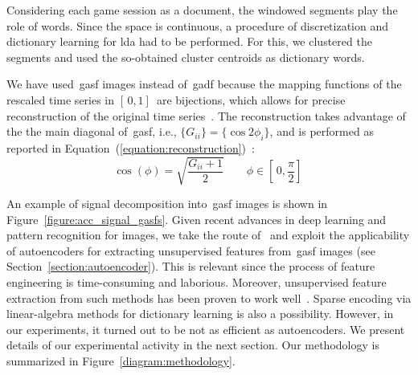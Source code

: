 Considering each game session as a document, the windowed segments play the role of words. Since the space is continuous, a procedure of discretization and dictionary learning for \gls{lda} had to be performed. For this, we clustered the segments and used the so-obtained cluster centroids as dictionary words.

We have used~\gls{gasf} images instead of~\gls{gadf} because the mapping functions of the rescaled time series in $[\,0,1]\,$ are bijections, which allows for precise reconstruction of the original time series~\cite{wang_imaging_2015}. The reconstruction takes advantage of the the main diagonal of~\gls{gasf}, i.e., $\{G_{ii}\} = \{\cos{2\phi_{i}}\}$, and is performed as reported in Equation~(\ref{equation:reconstruction})~\cite{wang_imaging_2015}: 
\begin{equation}\label{equation:reconstruction}
\cos(\phi)=\sqrt{\frac{G_{ii}+1}{2}} \qquad \phi \in [\,0,\frac{\pi}{2}]\,
\end{equation}

An example of signal decomposition into~\gls{gasf} images is shown in Figure~\ref{figure:acc_signal_gasfs}. Given recent advances in deep learning and pattern recognition for images, we take the route of~\cite{wang_encoding_2015} and exploit the applicability of autoencoders for extracting unsupervised features from~\gls{gasf} images (see Section~\ref{section:autoencoder}). This is relevant since the process of feature engineering is time-consuming and laborious. Moreover, unsupervised feature extraction from such methods has been proven to work well~\citep{wang_imaging_2015, wang_time_2016}.
Sparse encoding via linear-algebra methods for dictionary learning is also a possibility. However, in our experiments, it turned out to be not as efficient as autoencoders. We present details of our experimental activity in the next section. Our methodology is summarized in Figure~\ref{diagram:methodology}.

